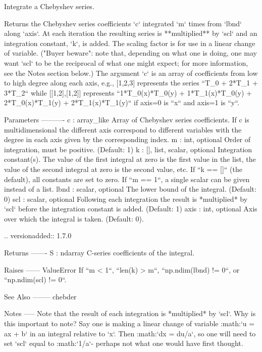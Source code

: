 \begin{DoxyVerb}Integrate a Chebyshev series.

Returns the Chebyshev series coefficients `c` integrated `m` times from
`lbnd` along `axis`. At each iteration the resulting series is
**multiplied** by `scl` and an integration constant, `k`, is added.
The scaling factor is for use in a linear change of variable.  ("Buyer
beware": note that, depending on what one is doing, one may want `scl`
to be the reciprocal of what one might expect; for more information,
see the Notes section below.)  The argument `c` is an array of
coefficients from low to high degree along each axis, e.g., [1,2,3]
represents the series ``T_0 + 2*T_1 + 3*T_2`` while [[1,2],[1,2]]
represents ``1*T_0(x)*T_0(y) + 1*T_1(x)*T_0(y) + 2*T_0(x)*T_1(y) +
2*T_1(x)*T_1(y)`` if axis=0 is ``x`` and axis=1 is ``y``.

Parameters
----------
c : array_like
    Array of Chebyshev series coefficients. If c is multidimensional
    the different axis correspond to different variables with the
    degree in each axis given by the corresponding index.
m : int, optional
    Order of integration, must be positive. (Default: 1)
k : {[], list, scalar}, optional
    Integration constant(s).  The value of the first integral at zero
    is the first value in the list, the value of the second integral
    at zero is the second value, etc.  If ``k == []`` (the default),
    all constants are set to zero.  If ``m == 1``, a single scalar can
    be given instead of a list.
lbnd : scalar, optional
    The lower bound of the integral. (Default: 0)
scl : scalar, optional
    Following each integration the result is *multiplied* by `scl`
    before the integration constant is added. (Default: 1)
axis : int, optional
    Axis over which the integral is taken. (Default: 0).

    .. versionadded:: 1.7.0

Returns
-------
S : ndarray
    C-series coefficients of the integral.

Raises
------
ValueError
    If ``m < 1``, ``len(k) > m``, ``np.ndim(lbnd) != 0``, or
    ``np.ndim(scl) != 0``.

See Also
--------
chebder

Notes
-----
Note that the result of each integration is *multiplied* by `scl`.
Why is this important to note?  Say one is making a linear change of
variable :math:`u = ax + b` in an integral relative to `x`.  Then
:math:`dx = du/a`, so one will need to set `scl` equal to
:math:`1/a`- perhaps not what one would have first thought.


\end{DoxyVerb}
